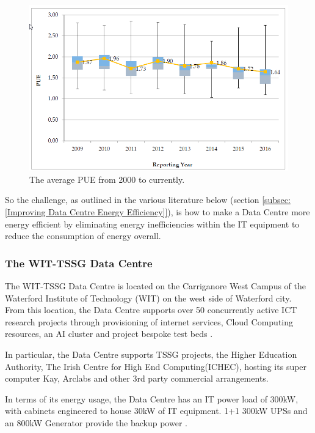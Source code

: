 \documentclass[12pt]{scrartcl}
\begin{document}
\begin{figure}[h]
  \caption{The average PUE from 2000 to currently.}
  \label{fig:PUE-by-year}
  \centering
    \includegraphics[scale=0.5]{Average_PUE_per_reporting_year}
\end{figure}
 
So the challenge, as outlined in the various literature below (section \ref{subsec:[Improving Data Centre Energy Efficiency]}), is how to make a Data Centre more energy efficient by eliminating energy inefficiencies within the IT equipment to reduce the consumption of energy overall. 

\subsubsection{The WIT-TSSG Data Centre}
\label{subsubsec:[The WIT-TSSG Data Centre]}

The WIT-TSSG Data Centre is located on the Carriganore West Campus of the Waterford Institute of Technology (WIT) on the west side of Waterford city. From this location, the Data Centre supports over 50 concurrently active ICT research projects through provisioning of internet services, Cloud Computing resources, an AI cluster and project bespoke test beds \citep{TSSG}. 

In particular, the Data Centre supports TSSG projects, the Higher Education Authority, The Irish Centre for High End Computing(ICHEC), hosting its super computer Kay, Arclabs and other 3rd party commercial arrangements.

In terms of its energy usage, the Data Centre has an IT power load of 300kW, with cabinets engineered to house 30kW of IT equipment. 1+1 300kW UPSs and an 800kW Generator provide the backup power \citep{TSSG}.
\end{document}

